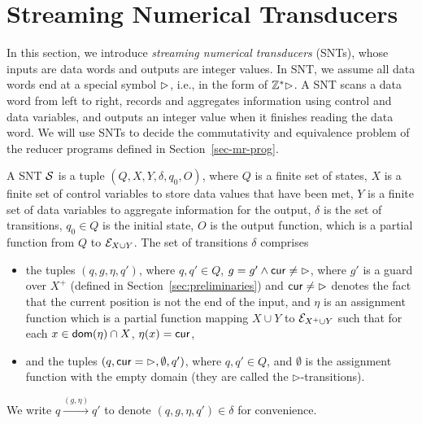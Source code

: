 


\section{Streaming Numerical Transducers}\label{sec:def-snt}

In this section, we introduce \emph{streaming numerical transducers} (SNTs), whose inputs are data words and outputs are integer values. 
In SNT, we assume all data words end at a special symbol $\rhd$, i.e., in the form of ${\mathbb{Z} }^*\rhd$.
A SNT scans a data word from left to right, records and aggregates information using control and data variables, and outputs an integer value when it finishes reading the data word. We will use SNTs to decide the commutativity and equivalence problem of the reducer programs defined in Section~\ref{sec-mr-prog}. 


A SNT ${\mathcal{S} }$ is a tuple $(Q, X, Y, \delta, q_0, O)$, where $Q$ is a finite set of states, $X$ is a finite set of control variables to store data values that have been met, $Y$ is a finite set of data variables to aggregate information for the output, $\delta$ is the set of transitions, $q_0 \in Q$ is the initial state, $O$ is the output function, which is a partial function from $Q$ to ${\mathcal{E} }_{X \cup Y}$.
The set of transitions $\delta$ comprises 
\begin{itemize}
\item the tuples $(q,  g, \eta, q')$, where $q,q'\in Q$, $g=g' \wedge \mathsf{cur} \neq \rhd$, where $g'$ is a guard over $X^+$ (defined in Section~\ref{sec:preliminaries}) and $\mathsf{cur} \neq \rhd$ denotes the fact that the current position is not the end of the input,  and $\eta$ is an assignment function which is a partial function mapping $X \cup Y$  to ${\mathcal{E} }_{X^+ \cup Y}$ such that for each $x \in \mathsf{dom}(\eta) \cap X$, $\eta(x)=\mathsf{cur}$,
%
\item and the tuples $(q, \mathsf{cur} = \rhd, \emptyset, q')$, where $q,q' \in Q$, and $\emptyset$ is the assignment function with the empty domain (they are called the $\triangleright$-transitions).
\end{itemize}
We write $q \xrightarrow{(g,\eta)} q'$ to denote $(q,g,\eta,q') \in \delta$ for convenience.  

